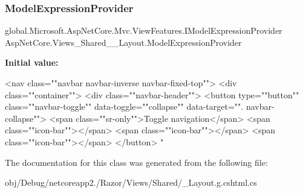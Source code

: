 \subsubsection{\texorpdfstring{Model\+Expression\+Provider}{ModelExpressionProvider}}
{\footnotesize\ttfamily global.\+Microsoft.\+Asp\+Net\+Core.\+Mvc.\+View\+Features.\+I\+Model\+Expression\+Provider Asp\+Net\+Core.\+Views\+\_\+\+Shared\+\_\+\+\_\+\+Layout.\+Model\+Expression\+Provider\hspace{0.3cm}{\ttfamily [get]}}

{\bfseries Initial value\+:}
\begin{DoxyCode}

    <nav \textcolor{keyword}{class}=\textcolor{stringliteral}{""}navbar navbar-inverse navbar-fixed-top\textcolor{stringliteral}{""}>
        <div \textcolor{keyword}{class}=\textcolor{stringliteral}{""}container\textcolor{stringliteral}{""}>
            <div \textcolor{keyword}{class}=\textcolor{stringliteral}{""}navbar-header\textcolor{stringliteral}{""}>
                <button type=\textcolor{stringliteral}{""}button\textcolor{stringliteral}{""} \textcolor{keyword}{class}=\textcolor{stringliteral}{""}navbar-toggle\textcolor{stringliteral}{""} data-toggle=\textcolor{stringliteral}{""}collapse\textcolor{stringliteral}{""} data-target=\textcolor{stringliteral}{""}.
      navbar-collapse\textcolor{stringliteral}{""}>
                    <span \textcolor{keyword}{class}=\textcolor{stringliteral}{""}sr-only\textcolor{stringliteral}{""}>Toggle navigation</span>
                    <span \textcolor{keyword}{class}=\textcolor{stringliteral}{""}icon-bar\textcolor{stringliteral}{""}></span>
                    <span \textcolor{keyword}{class}=\textcolor{stringliteral}{""}icon-bar\textcolor{stringliteral}{""}></span>
                    <span \textcolor{keyword}{class}=\textcolor{stringliteral}{""}icon-bar\textcolor{stringliteral}{""}></span>
                </button>
                \textcolor{stringliteral}{"}
\end{DoxyCode}


The documentation for this class was generated from the following file\+:\begin{DoxyCompactItemize}
\item 
obj/\+Debug/netcoreapp2./\+Razor/\+Views/\+Shared/\+\_\+\+Layout.\+g.\+cshtml.\+cs\end{DoxyCompactItemize}
